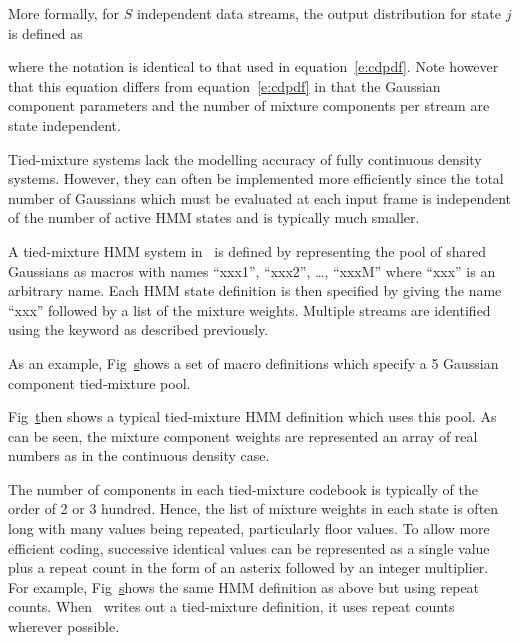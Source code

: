 More formally, for $S$ independent data streams, 
the output distribution for state $j$
is defined as 

where the notation is identical to that used in equation~\ref{e:cdpdf}.
Note however that this equation differs from equation~\ref{e:cdpdf}
in that the Gaussian component parameters and the 
number of mixture components
per stream are state independent.


Tied-mixture systems lack the modelling accuracy of fully continuous
density systems.  However, they can often be implemented more efficiently
since the total number of Gaussians which must be evaluated at
each input frame is independent of the number of active HMM states and
is typically much smaller.


A tied-mixture HMM system in \HTK\ is defined by representing the
pool of shared Gaussians as  macros with names ``xxx1'',
``xxx2'', \ldots, ``xxxM'' where ``xxx'' is an arbitrary name.
Each HMM state definition is then specified by giving the name
``xxx'' followed by a list of the mixture weights.  Multiple
streams are identified using the  keyword as described
previously.

As an example, Fig~\href{f:tmixpool} shows a set of macro
definitions which specify a 5 Gaussian component tied-mixture pool.


Fig~\href{f:tmixhmm} then shows a typical 
tied-mixture HMM definition
which uses this pool.  As can be seen, the mixture component weights
are represented an array of real numbers as in the continuous density case.

The number of components in each tied-mixture codebook is typically
of the order of 2 or 3 hundred.  Hence, the list of mixture weights in
each state is often long with many values being repeated, particularly
floor values.  To allow more efficient coding, successive identical
values can be represented as a single value plus a repeat count in the
form of an asterix followed by an integer multiplier.  For example,
Fig~\href{f:tmixhmm2} shows the same HMM definition as above but using
repeat counts.  When \HTK\ writes out a tied-mixture definition, it
uses repeat counts wherever possible.  

